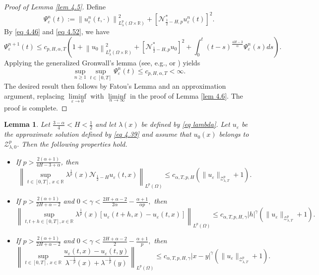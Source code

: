\documentclass[11pt,reqno]{amsart}
\numberwithin{equation}{section}
\newtheorem{lemma}{Lemma}[section]
\newcommand{\1}{{\bf 1}}
\newcommand{\2}{{\bf 2}}
\begin{document}
\begin{proof}[Proof of Lemma \ref{lem 4.5}]
 Define
$$
\Psi_{\varepsilon}^n(t):=\left\|u_{\varepsilon}^{n}(t,\cdot)\right\|^2_{L^p_{\lambda}(\Omega\times\mathbb{R})}+\left[\mathcal{N}_{\frac12-H,p}^*u_{\varepsilon}^{n}(t)\right]^2.
$$
By  \eqref{eq 4.46} and  \eqref{eq 4.52}, we have
 $$
\Psi_{\varepsilon}^{n+1}(t)\le c_{p,H,\alpha,T}\left(1+\left\|u_0\right\|_{L^p_{\lambda}(\Omega\times\mathbb{R})}^2+\left[\mathcal{N}_{\frac12-H,p}^*u_{0}\right]^2+\int_{0}^t(t-s)^{\frac{4H-3}{\alpha}}\Psi_{\varepsilon}^n(s)ds\right).
$$
Applying the generalized Gronwall's lemma (see, e.g., \cite[Lemma 15]{Dalang1999} or \cite[Lemma 1]{LHH2021}) yields
 $$
\sup_{n\ge1}\sup_{t\in[0,T]}\Psi_{\varepsilon}^{n}(t)\le c_{p,H,\alpha,T}<\infty.
$$
The desired result then  follows by Fatou's Lemma and an approximation argument,  replacing
$\liminf\limits_{\varepsilon\to0}$ with  $\liminf\limits_{n\to\infty}$  in the proof of Lemma \ref{lem 4.6}.
 The proof is complete.
 \end{proof}



\begin{lemma}\label{lem 4.7} Let $\frac{3-\alpha}{4}<H<\frac12$ and let $\lambda(x)$ be defined by \eqref{eq lambda}.
Let $u_{\varepsilon}$ be the approximate solution defined by \eqref{eq 4.39} and assume that $u_0(x)$ belongs to $\mathcal{Z}_{\lambda,0}^p$. Then  the following properties hold.
\begin{itemize}
\item[(i).]  If $p>\frac{2(\alpha+1)}{4H-3+\alpha}$, then
\begin{equation}\label{eq 4.55}
\left\|\sup_{t\in[0,T],\,x\in\mathbb{R}}\lambda^{\frac1{p}}(x)\mathcal{N}_{\frac12-H}u_{\varepsilon}(t,x)\right\|_{L^{p}(\Omega)}\le c_{\alpha,T,p,H}\left(\|u_{\varepsilon}\|_{\mathcal{Z}_{\lambda,T}^p}+1\right).
\end{equation}
\item[(ii).]  If $p>\frac{2(\alpha+1)}{2H+\alpha-2}$ and $0<\gamma<\frac{2H+\alpha-2}{2\alpha}-\frac{\alpha+1}{\alpha p},$ then
\begin{equation}\label{eq 4.56}
\left\|\sup_{t,t+h\in[0,T],x\in\mathbb{R}}\lambda^{\frac1{p}}(x)\left[u_{\varepsilon}(t+h,x)-u_{\varepsilon}(t,x)\right]\right\|_{L^{p}(\Omega)}\le c_{\alpha,T,p,H,\gamma}|h|^{\gamma}\left(\|u_{\varepsilon}\|_{\mathcal{Z}_{\lambda,T}^p}+1\right).
\end{equation}

 
\item[(iii).]  If $p>\frac{2(\alpha+1)}{2H+\alpha-2}$ and $0<\gamma<\frac{2H+\alpha-2}{2}-\frac{\alpha+1}{p},$ then
\begin{equation}\label{eq 4.57}
\left\|\sup_{t\in[0,T],\,x\in\mathbb{R}}\frac{u_{\varepsilon}(t,x)-u_{\varepsilon}(t,y)}{\lambda^{-\frac1p}(x)+\lambda^{-\frac1p}(y)}\right\|_{L^{p}(\Omega)}\le c_{\alpha,T,p,H,\gamma}|x-y|^{\gamma}\left(\|u_{\varepsilon}\|_{\mathcal{Z}_{\lambda,T}^p}+1\right).
\end{equation}
  \end{itemize}
 \end{lemma}
 
\end{document}
